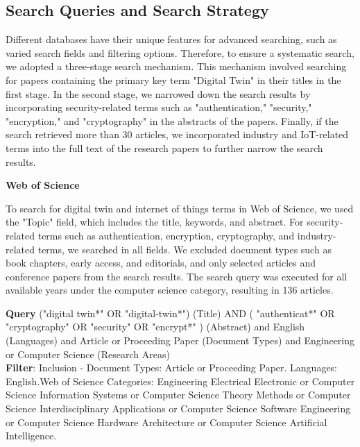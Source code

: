 \subsection{Search Queries and Search Strategy}
Different databases have their unique features for advanced searching, such as varied search fields and filtering options. Therefore, to ensure a systematic search, we adopted a three-stage search mechanism. This mechanism involved searching for papers containing the primary key term "Digital Twin" in their titles in the first stage. In the second stage, we narrowed down the search results by incorporating security-related terms such as "authentication," "security," "encryption," and "cryptography" in the abstracts of the papers. Finally, if the search retrieved more than 30 articles, we incorporated industry and IoT-related terms into the full text of the research papers to further narrow the search results.


\textbf{Web of Science}

To search for digital twin and internet of things terms in Web of Science, we used the "Topic" field, which includes the title, keywords, and abstract. For security-related terms such as authentication, encryption, cryptography, and industry-related terms, we searched in all fields. We excluded document types such as book chapters, early access, and editorials, and only selected articles and conference papers from the search results. The search query was executed for all available years under the computer science category, resulting in 136 articles.

\begin{tcolorbox}[colback=black!5!white, sharp corners=all, colframe=white!95!black]
\textbf{Query}
\tcblower
("digital twin*" OR "digital-twin*") (Title) AND ( "authenticat*" OR "cryptography" OR "security" OR "encrypt*" ) (Abstract) and English (Languages) and Article or Proceeding Paper (Document Types) and Engineering or Computer Science (Research Areas) \\


\textbf{Filter}: Inclusion - Document Types: Article or Proceeding Paper. Languages: English.Web of Science Categories: Engineering Electrical Electronic or Computer Science Information Systems or Computer Science Theory Methods or Computer Science Interdisciplinary Applications or Computer Science Software Engineering or Computer Science Hardware Architecture or Computer Science Artificial Intelligence.

\end{tcolorbox}



